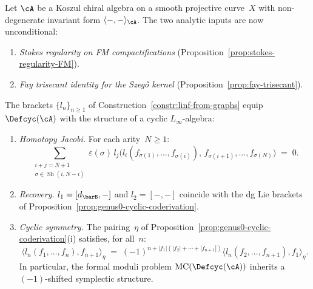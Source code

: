 \begin{theorem}\label{thm:cyclic-linf-graph}
Let $\cA$ be a Koszul chiral algebra on a smooth projective
curve~$X$ with non-degenerate invariant form
$\langle{-},{-}\rangle_{\cA}$.
The two analytic inputs are now unconditional:
\begin{enumerate}[label=\textup{(H\arabic*)}]
\item\label{hyp:stokes-FM}
  \emph{Stokes regularity on FM compactifications}
  \textup{(}Proposition~\textup{\ref{prop:stokes-regularity-FM}}\textup{)}.
\item\label{hyp:fay-propagator}
  \emph{Fay trisecant identity for the Szeg\H{o} kernel}
  \textup{(}Proposition~\textup{\ref{prop:fay-trisecant}}\textup{)}.
\end{enumerate}
The brackets $\{l_n\}_{n \geq 1}$ of
Construction~\textup{\ref{constr:linf-from-graphs}} equip
$\Defcyc(\cA)$ with the structure of a cyclic $L_\infty$-algebra:
\begin{enumerate}[label=\textup{(\alph*)}]
\item \emph{Homotopy Jacobi.}
  For each arity~$N \geq 1$:
  \begin{equation}\label{eq:homotopy-jacobi-graph}
  \sum_{\substack{i + j = N + 1 \\
  \sigma \in \operatorname{Sh}(i,N-i)}}
  \varepsilon(\sigma)\,
  l_j\bigl(l_i(f_{\sigma(1)}, \ldots, f_{\sigma(i)}),\,
  f_{\sigma(i+1)}, \ldots, f_{\sigma(N)}\bigr) \;=\; 0.
  \end{equation}
\item \emph{Recovery.}
  $l_1 = [d_{\barB}, -]$ and
  $l_2 = [-,-]$ coincide with the dg Lie brackets of
  Proposition~\textup{\ref{prop:genus0-cyclic-coderivation}}.
\item \emph{Cyclic symmetry.}
  The pairing~$\eta$ of
  Proposition~\textup{\ref{prop:genus0-cyclic-coderivation}(i)}
  satisfies, for all~$n$:
  \begin{equation}\label{eq:cyclic-symmetry-graph}
  \langle l_n(f_1, \ldots, f_n), f_{n+1}\rangle_\eta
  \;=\;
  (-1)^{n + |f_1|(|f_2|+\cdots+|f_{n+1}|)}
  \langle l_n(f_2, \ldots, f_{n+1}), f_1\rangle_\eta.
  \end{equation}
  In particular, the formal moduli problem
  $\operatorname{MC}(\Defcyc(\cA))$ inherits a $(-1)$-shifted
  symplectic structure.
\end{enumerate}
\end{theorem}

